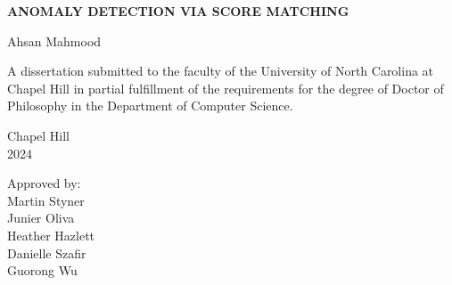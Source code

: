 \begin{titlepage}
\begin{center}


\vspace{2in}
\begin{singlespace}
\bf
ANOMALY DETECTION VIA SCORE MATCHING
\end{singlespace}


\vspace{60pt} %
\large Ahsan Mahmood
\end{center}



\vspace{45pt}
\begin{singlespace}
\noindent \large
\begin{center}
A dissertation submitted to the faculty of the University of North Carolina at Chapel Hill
in partial fulfillment of the requirements for the degree of Doctor of Philosophy in
the Department of Computer Science.
\end{center}
\end{singlespace}


\vspace{45pt}
\begin{center}
\begin{singlespace} \large
Chapel Hill\\
2024
\end{singlespace}
\end{center}


\vspace{40pt}
\begin{flushright}
\begin{minipage}[t]{1.5in} \large
Approved by:\\
Martin Styner \\
Junier Oliva \\
Heather Hazlett \\
Danielle Szafir \\
Guorong Wu

\end{minipage}
\end{flushright}

\end{titlepage}